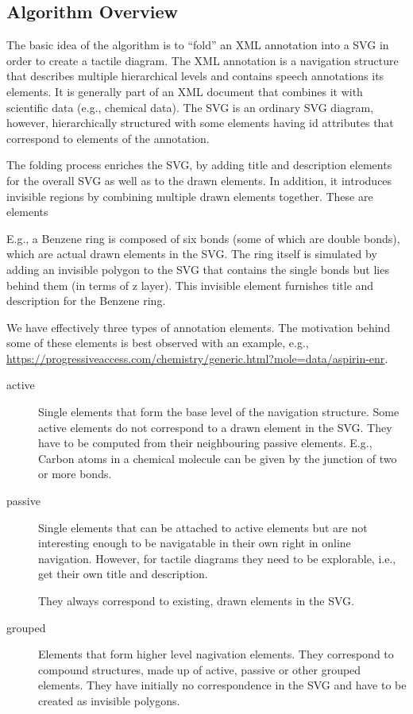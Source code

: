 \documentclass{article}
\begin{document}
\subsection*{Algorithm Overview}

The basic idea of the algorithm is to ``fold'' an XML annotation into a SVG in
order to create a tactile diagram. The XML annotation is a navigation structure
that describes multiple hierarchical levels and contains speech annotations its
elements.  It is generally part of an XML document that combines it with
scientific data (e.g., chemical data).  The SVG is an ordinary SVG diagram,
however, hierarchically structured with some elements having id attributes that
correspond to elements of the annotation.

The folding process enriches the SVG, by adding title and description elements
for the overall SVG as well as to the drawn elements. In addition, it introduces
invisible regions by combining multiple drawn elements together. These are elements

E.g., a Benzene ring is composed of six bonds (some of which are double bonds),
which are actual drawn elements in the SVG. The ring itself is simulated by
adding an invisible polygon to the SVG that contains the single bonds but lies
behind them (in terms of z layer). This invisible element furnishes title and
description for the Benzene ring.

We have effectively three types of annotation elements. The motivation behind
some of these elements is best observed with an example, e.g.,
\url{https://progressiveaccess.com/chemistry/generic.html?mole=data/aspirin-enr}.
\begin{description}
\item[active] Single elements that form the base level of the navigation
  structure.  Some active elements do not correspond to a drawn element in the
  SVG. They have to be computed from their neighbouring passive elements.  E.g.,
  Carbon atoms in a chemical molecule can be given by the junction of two or
  more bonds.
\item[passive] Single elements that can be attached to active elements but are
  not interesting enough to be navigatable in their own right in online
  navigation. However, for tactile diagrams they need to be explorable, i.e.,
  get their own title and description.
  
  They always correspond to existing, drawn elements in the SVG.
\item[grouped] Elements that form higher level nagivation elements. They
  correspond to compound structures, made up of active, passive or other grouped
  elements. They have initially no correspondence in the SVG and have to be
  created as invisible polygons.
\end{description}
\end{document}
